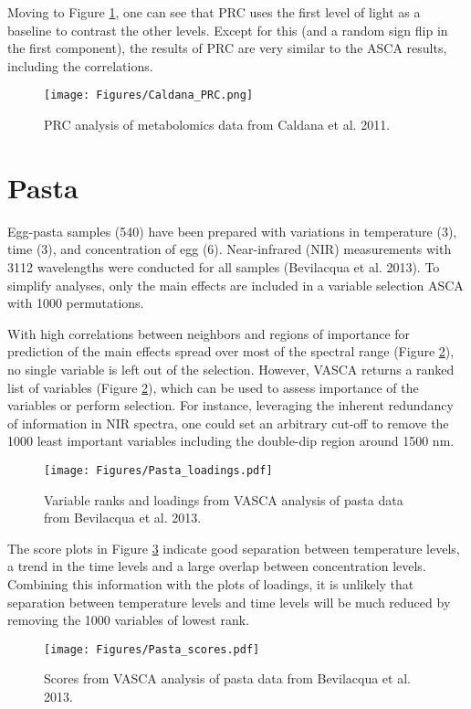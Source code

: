 Moving to Figure \ref{FigChx:Caldana_PRC}, one can see that PRC uses the first level of light as a baseline to contrast the other levels. Except for this (and a random sign flip in the first component), the results of PRC are very similar to the ASCA results, including the correlations.

\begin{figure}[h!]
 \centering
 \texttt{[image: Figures/Caldana\_PRC.png]}
 \caption{\footnotesize PRC analysis of metabolomics data from Caldana et al. 2011.}
 \label{FigChx:Caldana_PRC}
\end{figure}


\section{Pasta}
Egg-pasta samples (540) have been prepared with variations in temperature (3), time (3), and concentration of egg (6). Near-infrared (NIR) measurements with 3112 wavelengths were conducted for all samples (Bevilacqua et al. 2013). To simplify analyses, only the main effects are included in a variable selection ASCA with 1000 permutations.

With high correlations between neighbors and regions of importance for prediction of the main effects spread over most of the spectral range (Figure \ref{FigChx:Pasta_loadings}), no single variable is left out of the selection. However, VASCA returns a ranked list of variables (Figure \ref{FigChx:Pasta_loadings}), which can be used to assess importance of the variables or perform selection. For instance, leveraging the inherent redundancy of information in NIR spectra, one could set an arbitrary cut-off to remove the 1000 least important variables including the double-dip region around 1500 nm.

\begin{figure}[h!]
 \centering
 \texttt{[image: Figures/Pasta\_loadings.pdf]}
 \caption{\footnotesize Variable ranks and loadings from VASCA analysis of pasta data from Bevilacqua et al. 2013.}
 \label{FigChx:Pasta_loadings}
\end{figure}

The score plots in Figure \ref{FigChx:Pasta_scores} indicate good separation between temperature levels, a trend in the time levels and a large overlap between concentration levels. Combining this information with the plots of loadings, it is unlikely that separation between temperature levels and time levels will be much reduced by removing the 1000 variables of lowest rank.

\begin{figure}[h!]
 \centering
 \texttt{[image: Figures/Pasta\_scores.pdf]}
 \caption{\footnotesize Scores from VASCA analysis of pasta data from Bevilacqua et al. 2013.}
 \label{FigChx:Pasta_scores}
\end{figure}
